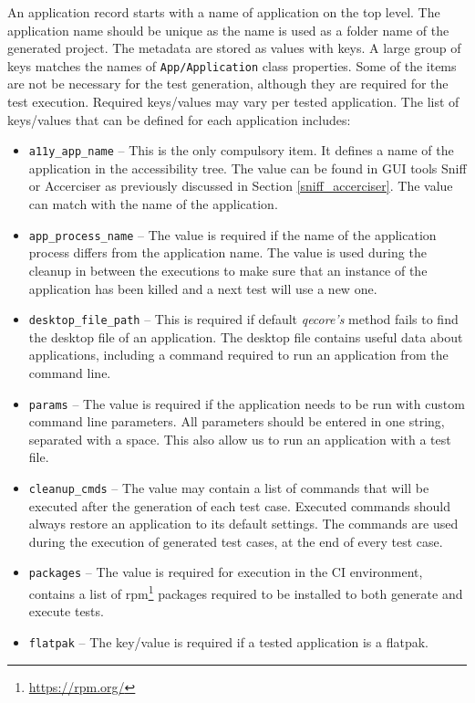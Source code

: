 An application record starts with a name of application on the top level. The application name should be unique as the name is used as a folder name of the generated project. The metadata are stored as values with keys. A large group of keys matches the names of \texttt{App/Application} class properties. Some of the items are not be necessary for the test generation, although they are required for the test execution. Required keys/values may vary per tested application. The list of keys/values that can be defined for each application includes:

\begin{itemize}
    \item \texttt{a11y\_app\_name} -- This is the only compulsory item. It defines a name of the application in the accessibility tree. The value can be found in GUI tools Sniff or Accerciser as previously discussed in Section \ref{sniff_accerciser}. The value can match with the name of the application.
     \item \texttt{app\_process\_name} -- The value is required if the name of the application process differs from the application name. The value is used during the cleanup in between the executions to make sure that an instance of the application has been killed and a next test will use a new one.
     \item \texttt{desktop\_file\_path} -- This is required if default \textit{qecore's} method fails to find the desktop file of an application. The desktop file contains useful data about applications, including a command required to run an application from the command line.
     \item \texttt{params} --  The value is required if the application needs to be run with custom command line parameters. All parameters should be entered in one string, separated with a space. This also allow us to run an application with a test file. 
     \item \texttt{cleanup\_cmds} -- The value may contain a list of commands that will be executed after the generation of each test case. Executed commands should always restore an application to its default settings. The commands are used during the execution of generated test cases, at the end of every test case. 
     \item \texttt{packages} -- The value is required for execution in the CI environment, contains a list of rpm\footnote{\url{https://rpm.org/}} packages required to be installed to both generate and execute tests.
     \item \texttt{flatpak} -- The key/value is required if a tested application is a flatpak.
\end{itemize}

